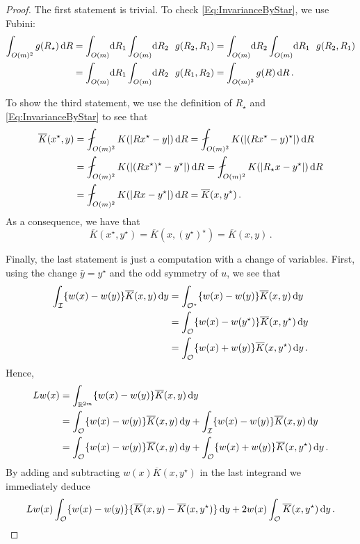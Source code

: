 \begin{proof}
The first statement is trivial. To check \eqref{Eq:InvarianceByStar}, we use Fubini:
\begin{align*}
\int_{O(m)^2} g(R_\star) \d R & = \int_{O(m)} \!\! \d R_1 \int_{O(m)} \!\! \d R_2 \ \ g(R_2, R_1)  =  \int_{O(m)} \!\! \d R_2 \int_{O(m)} \!\! \d R_1 \ \ g(R_2, R_1) \\
& =  \int_{O(m)} \!\! \d R_1 \int_{O(m)} \!\! \d R_2 \ \ g(R_1, R_2)  =  \int_{O(m)^2} g(R) \d R\,.
\end{align*}

To show the third statement, we use the definition of $R_\star$ and \eqref{Eq:InvarianceByStar}
to see that
\begin{align*}
\overline{K}(x^\star,y) &= \average_{O(m)^2} K(|Rx^\star - y|) \d R = \average_{O(m)^2} K(|(Rx^\star - y)^\star|) \d R \\
&= \average_{O(m)^2} K(|(R x^\star)^\star - y^\star|) \d R = \average_{O(m)^2} K(|R_\star x - y^\star|) \d R \\
&= \average_{O(m)^2} K(|Rx - y^\star|) \d R = \overline{K}(x,y^\star)\,.
\end{align*}
As a consequence, we have that
$$\overline{K}(x^\star,y^\star) = \overline{K}(x,(y^\star)^\star) = \overline{K}(x,y)\,.$$



Finally, the last statement is just a computation with a change of variables. First, using the
change $\bar{y} = y^\star$ and the odd symmetry of $u$, we see that
\begin{align*}
\int_{\mathcal{I}}  \{w(x) - w(y) \} \overline{K}(x, y)\,\mathrm{d} y &= \int_{\mathcal{O}^\star} \{w(x) - w(y) \}\overline{K}(x, y)\,\mathrm{d} y \\
&= \int_{\mathcal{O}} \{w(x) - w(y^\star) \}\overline{K}(x, y^\star)\,\mathrm{d} y \\
&= \int_{\mathcal{O}} \{w(x) + w(y) \}\overline{K}(x, y^\star)\,\mathrm{d} y\,.
\end{align*}
Hence,
\begin{align*}
Lw (x) &= \int_{\mathbb{R}^{2m}}  \{w(x) - w(y) \} \overline{K}(x, y)\,\mathrm{d} y \\
&= \int_{\mathcal{O}}  \{w(x) - w(y) \} \overline{K}(x, y)\,\mathrm{d} y +\int_{\mathcal{I}}  \{w(x) - w(y) \} \overline{K}(x, y)\,\mathrm{d} y \\
&= \int_{\mathcal{O}} \{w(x) - w(y) \} \overline{K}(x, y) \,\mathrm{d} y +  \int_{\mathcal{O}} \{w(x) + w(y) \} \overline{K}(x, y^\star) \,\mathrm{d} y \,.
\end{align*}
By adding and subtracting $w(x)\overline{K}(x, y^\star)$ in the last integrand we immediately deduce
$$
Lw (x) \int_{\mathcal{O}} \{w(x) - w(y) \} \{\overline{K}(x, y) - \overline{K}(x, y^\star)  \} \,\mathrm{d} y +  2 w(x) \int_{\mathcal{O}} \overline{K}(x, y^\star) \,\mathrm{d} y\,.
$$
\end{proof}


